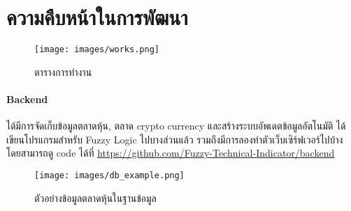 \chapter{ความคืบหน้าในการพัฒนา}
\begin{figure}[ht]
    \centering
    \texttt{[image: images/works.png]}
    \caption{ตารางการทำงาน}
\end{figure}
\subsubsection{Backend}
ได้มีการจัดเก็บข้อมูลตลาดหุ้น, ตลาด crypto currency และสร้างระบบอัพเดตข้อมูลอัตโนมัติ ได้เขียนโปรแกรมสำหรับ Fuzzy Logic ไปบางส่วนแล้ว
รวมถึงมีการลองทำตัวเว็บเซิร์ฟเวอร์ไปบ้าง โดยสามารถดู code ได้ที่ \url{https://github.com/Fuzzy-Technical-Indicator/backend}

\begin{figure}[ht]
    \centering
    \texttt{[image: images/db\_example.png]}
    \caption{ตัวอย่างข้อมูลตลาดหุ้นในฐานข้อมูล}
\end{figure}
\pagebreak



